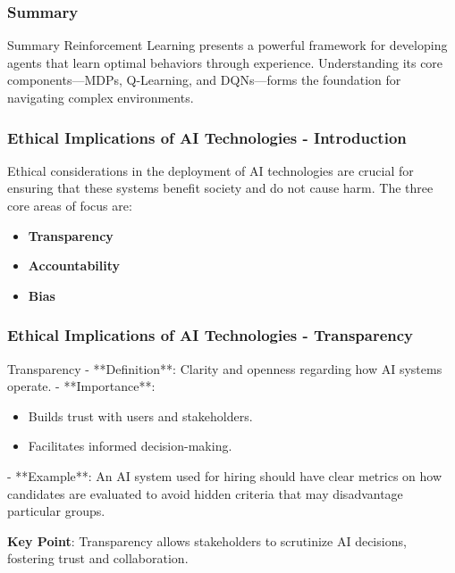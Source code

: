 \documentclass[aspectratio=169]{beamer}
\begin{document}
\begin{frame}[fragile]
    \frametitle{Summary}
    \begin{block}{Summary}
        Reinforcement Learning presents a powerful framework for developing agents that learn optimal behaviors through experience. Understanding its core components—MDPs, Q-Learning, and DQNs—forms the foundation for navigating complex environments.
    \end{block}
\end{frame}

\begin{frame}[fragile]
    \frametitle{Ethical Implications of AI Technologies - Introduction}
    Ethical considerations in the deployment of AI technologies are crucial for ensuring that these systems benefit society and do not cause harm. The three core areas of focus are:
    \begin{itemize}
        \item \textbf{Transparency}
        \item \textbf{Accountability}
        \item \textbf{Bias}
    \end{itemize}
\end{frame}

\begin{frame}[fragile]
    \frametitle{Ethical Implications of AI Technologies - Transparency}
    \begin{block}{Transparency}
        - **Definition**: Clarity and openness regarding how AI systems operate.
        - **Importance**:
        \begin{itemize}
            \item Builds trust with users and stakeholders.
            \item Facilitates informed decision-making.
        \end{itemize}
        - **Example**: An AI system used for hiring should have clear metrics on how candidates are evaluated to avoid hidden criteria that may disadvantage particular groups.
    \end{block}
    \textbf{Key Point}: Transparency allows stakeholders to scrutinize AI decisions, fostering trust and collaboration.
\end{frame}
\end{document}

